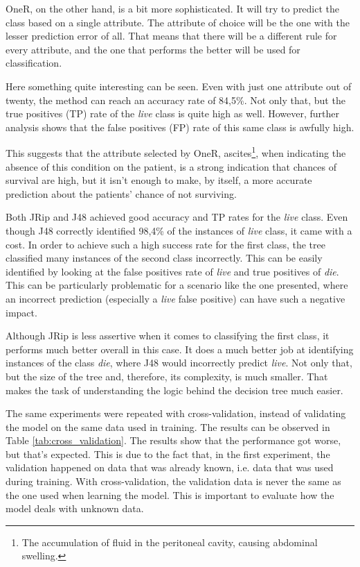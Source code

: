 \documentclass{article}
\begin{document}
OneR, on the other hand, is a bit more sophisticated. It will try to predict the class based on a single attribute. The attribute of choice will be the one with the lesser prediction error of all. That means that there will be a different rule for every attribute, and the one that performs the better will be used for classification.

Here something quite interesting can be seen. Even with just one attribute out of twenty, the method can reach an accuracy rate of 84,5\%. Not only that, but the true positives (TP) rate of the \textit{live} class is quite high as well. However, further analysis shows that the false positives (FP) rate of this same class is awfully high. 

This suggests that the attribute selected by OneR, ascites\footnote{The accumulation of fluid in the peritoneal cavity, causing abdominal swelling.}, when indicating the absence of this condition on the patient, is a strong indication that chances of survival are high, but it isn't enough to make, by itself, a more accurate prediction about the patients' chance of not surviving.

Both JRip and J48 achieved good accuracy and TP rates for the \textit{live} class. Even though J48 correctly identified 98,4\% of the instances of \textit{live} class, it came with a cost. In order to achieve such a high success rate for the first class, the tree classified many instances of the second class incorrectly. This can be easily identified by looking at the false positives rate of \textit{live} and true positives of \textit{die}. This can be particularly problematic for a scenario like the one presented, where an incorrect prediction (especially a \textit{live} false positive) can have such a negative impact.

Although JRip is less assertive when it comes to classifying the first class, it performs much better overall in this case. It does a much better job at identifying instances of the class \textit{die}, where J48 would incorrectly predict \textit{live}. Not only that, but the size of the tree and, therefore, its complexity, is much smaller.  That makes the task of understanding the logic behind the decision tree much easier.

The same experiments were repeated with cross-validation, instead of validating the model on the same data used in training. The results can be observed in Table \ref{tab:cross_validation}. The results show that the performance got worse, but that's expected. This is due to the fact that, in the first experiment, the validation happened on data that was already known, i.e. data that was used during training. With cross-validation, the validation data is never the same as the one used when learning the model. This is important to evaluate how the model deals with unknown data.
\end{document}
